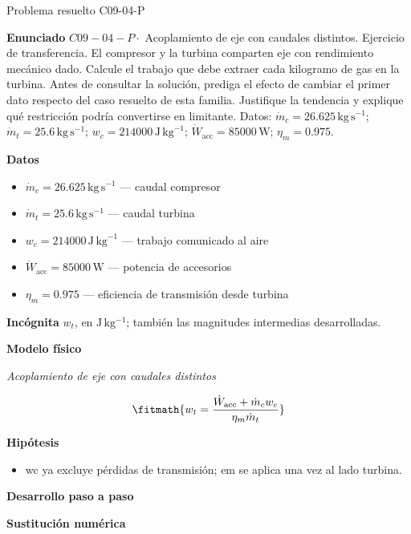 \documentclass[10pt,openany]{book}
\begin{document}
\begin{studiumworked}{Problema resuelto C09-04-P}


\noindent\textbf{Enunciado}
\(C09-04-P \cdot\) Acoplamiento de eje con caudales distintos. Ejercicio de transferencia. El compresor y la turbina comparten eje con rendimiento mecánico dado. Calcule el trabajo que debe extraer cada kilogramo de gas en la turbina. Antes de consultar la solución, prediga el efecto de cambiar el primer dato respecto del caso resuelto de esta familia. Justifique la tendencia y explique qué restricción podría convertirse en limitante. Datos: \(\dot{m}_c=26.625\, \mathrm{kg}\,\mathrm{s}^{-1}\); \(\dot{m}_t=25.6\, \mathrm{kg}\,\mathrm{s}^{-1}\); \(w_c=214000\, \mathrm{J}\,\mathrm{kg}^{-1}\); \(\dot{W}_{\mathrm{acc}}=85000\, \mathrm{W}\); \(\eta_m=0.975\).

\noindent\textbf{Datos}
\begin{itemize}
\item $\dot{m}_c = 26.625\,\mathrm{kg}\,\mathrm{s}^{-1}$ — caudal compresor
\item $\dot{m}_t = 25.6\,\mathrm{kg}\,\mathrm{s}^{-1}$ — caudal turbina
\item $w_c = 214000\,\mathrm{J}\,\mathrm{kg}^{-1}$ — trabajo comunicado al aire
\item $\dot{W}_{\mathrm{acc}} = 85000\,\mathrm{W}$ — potencia de accesorios
\item $\eta_m = 0.975$ — eficiencia de transmisión desde turbina
\end{itemize}

\noindent\textbf{Incógnita}
$w_t$, en $\mathrm{J\,kg^{-1}}$; también las magnitudes intermedias desarrolladas.

\noindent\textbf{Modelo físico}

\noindent\textit{Acoplamiento de eje con caudales distintos}

\[
\fitmath{w_t=\frac{\dot{W}_{\mathrm{acc}} + \dot{m}_c w_c}{\eta_m \dot{m}_t}}
\]

\noindent\textbf{Hipótesis}
\begin{itemize}
\item wc ya excluye pérdidas de transmisión; em se aplica una vez al lado turbina.
\end{itemize}

\noindent\textbf{Desarrollo paso a paso}



\noindent\textbf{Sustitución numérica}


\end{studiumworked}
\end{document}
